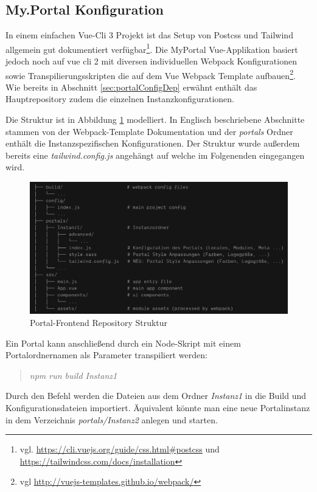 \subsection{My.Portal Konfiguration}
In einem einfachen Vue-Cli 3 Projekt ist das Setup von Postcss und Tailwind allgemein gut dokumentiert verfügbar\footnote{vgl. \url{https://cli.vuejs.org/guide/css.html\#postcss} und \url{https://tailwindcss.com/docs/installation}}. Die MyPortal Vue-Applikation basiert jedoch noch auf vue cli 2 mit diversen individuellen Webpack Konfigurationen sowie Transpilierungsskripten die auf dem Vue Webpack Template aufbauen\footnote{vgl \url{http://vuejs-templates.github.io/webpack/}}. Wie bereits in Abschnitt \ref{sec:portalConfigDep} erwähnt enthält das Hauptrepository zudem die einzelnen Instanzkonfigurationen.

Die Struktur ist in Abbildung \ref{fig:structureDir} modelliert. In Englisch beschriebene Abschnitte stammen von der Webpack-Template Dokumentation und der \textit{portals} Ordner enthält die Instanzspezifischen Konfigurationen. Der Struktur wurde außerdem bereits eine \textit{tailwind.config.js} angehängt auf welche im Folgenenden eingegangen wird.

\begin{figure}[!ht]
	\centering
		\includegraphics[width=.85\textwidth]{images/005-000-001-structureDir.png}
	\caption{Portal-Frontend Repository Struktur}
	\label{fig:structureDir}
\end{figure}

Ein Portal kann anschließend durch ein Node-Skript mit einem Portalordnernamen als Parameter transpiliert werden:

\begin{quotation}
	\emph{npm run build Instanz1}
\end{quotation}

Durch den Befehl werden die Dateien aus dem Ordner \textit{Instanz1} in die Build und Konfigurationsdateien importiert. Äquivalent könnte man eine neue Portalinstanz in dem Verzeichnis \textit{portals/Instanz2} anlegen und starten.

